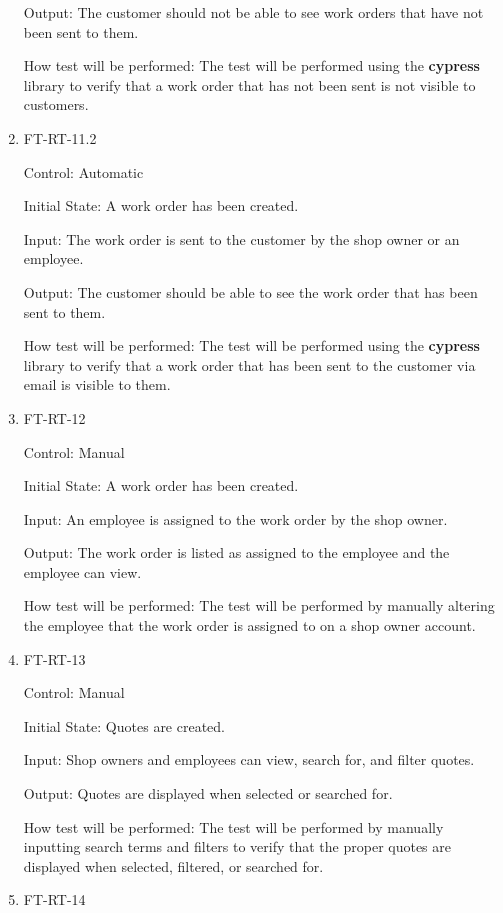 \documentclass[12pt, titlepage]{article}
\begin{document}
\begin{enumerate}
Output: The customer should not be able to see work orders that have not been sent to them.

How test will be performed: The test will be performed using the \textbf{cypress} library to verify that a work order that has not been sent is not visible to customers.

\item{FT-RT-11.2\\}

Control: Automatic

Initial State: A work order has been created.

Input: The work order is sent to the customer by the shop owner or an employee.

Output: The customer should be able to see the work order that has been sent to them.

How test will be performed: The test will be performed using the \textbf{cypress} library to verify that a work order that has been sent to the customer via email is visible to them.

\item{FT-RT-12\\}

Control: Manual

Initial State: A work order has been created.

Input: An employee is assigned to the work order by the shop owner.

Output: The work order is listed as assigned to the employee and the employee can view.

How test will be performed: The test will be performed by manually altering the employee that the work order is assigned to on a shop owner account.

\item{FT-RT-13\\}

Control: Manual

Initial State: Quotes are created.

Input: Shop owners and employees can view, search for, and filter quotes.

Output: Quotes are displayed when selected or searched for.

How test will be performed: The test will be performed by manually inputting search terms and filters to verify that the proper quotes are displayed when selected, filtered, or searched for.

\item{FT-RT-14\\}


\end{enumerate}
\end{document}
